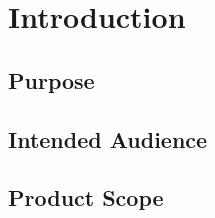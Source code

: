 \documentclass{article}
\begin{document}

\normalsize

\newpage
\tableofcontents

\newpage
\section{Introduction}
\subsection{Purpose}



\subsection{Intended Audience} %

\subsection{Product Scope}
\end{document}

